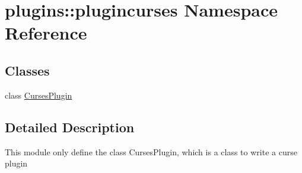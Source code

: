 \hypertarget{namespaceplugins_1_1plugincurses}{\section{plugins\-:\-:plugincurses \-Namespace \-Reference}
\label{namespaceplugins_1_1plugincurses}
}
\subsection*{\-Classes}
\begin{DoxyCompactItemize}
\item 
class \hyperlink{classplugins_1_1plugincurses_1_1_curses_plugin}{\-Curses\-Plugin}
\end{DoxyCompactItemize}


\subsection{\-Detailed \-Description}
\begin{DoxyVerb}
    This module only define the class CursesPlugin,
    which is a class to write a curse plugin
\end{DoxyVerb}
 